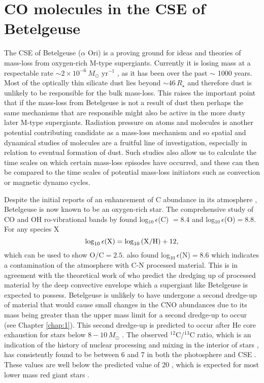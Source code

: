 \section{CO molecules in the CSE of Betelgeuse}
\label{sec:5.1}
The CSE of Betelgeuse ($\alpha$ Ori) is a proving ground for ideas and theories of mass-loss from oxygen-rich M-type supergiants. Currently it is losing mass at a respectable rate $\sim 2\times 10^{-6} \ M_{\odot}$ yr${}^{-1}$ \citep{harper_2001}, as it has been over the past $\sim$ 1000 years. Most of the optically thin silicate dust lies beyond $\sim 46\,R_{\star}$ \citep{danchi_1994} and therefore dust is unlikely to be responsible for the bulk mass-loss. This raises the important point that if the mass-loss from Betelgeuse is not a result of dust then perhaps the same mechanisms that are responsible might also be active in the more dusty later M-type supergiants. Radiation pressure on atoms and molecules is another potential contributing candidate as a mass-loss mechanism and so spatial and dynamical studies of molecules are a fruitful line of investigation, especially in relation to eventual formation of dust. Such studies also allow us to calculate the time scales on which certain mass-loss episodes have occurred, and these can then be compared to the time scales of potential mass-loss initiators such as convection or magnetic dynamo cycles.

Despite the initial reports of an enhancement of C abundance in its atmosphere \citep{spinrad_1966}, Betelgeuse is now known to be an oxygen-rich star. The comprehensive study of CO and OH ro-vibrational bands by \cite{lambert_1984} found log$_{10}$\,$\epsilon$(C) $ = 8.4$ and log$_{10}$\,$\epsilon$(O)$ = 8.8$. For any species X
\begin{equation}
\rm{log}_{10}\,\epsilon(X)=\rm{log}_{10}\,(X/H)+12,
\end{equation}
which can be used to show O/C$ = 2.5$. \cite{lambert_1984} also found log$_{10}$\,$\epsilon$(N)$ = 8.6$ which indicates a contamination of the atmosphere with C-N processed material. This is in agreement with the theoretical work of \cite{lamb_1976} who predict the dredging up of processed material by the deep convective envelope which a supergiant like Betelgeuse is expected to possess. Betelgeuse is unlikely to have undergone a second dredge-up of material that would cause small changes in the CNO abundances due to its mass being greater than the upper mass limit for a second dredge-up to occur (see Chapter \ref{chap:1}). This second dredge-up is predicted to occur after He core exhaustion for stars below $8-10 \,M_{\odot}$ \citep{kaler_1978}. The observed $^{12}$C/$^{13}$C ratio, which is an indication of the history of nuclear processing and mixing in the interior of stars \citep{pavlenko_2003,eggleton_2007}, has consistently found to be between 6 and 7 in both the photosphere and CSE \citep{lambert_1974,hinkle_1976,bernat_1979,harris_1984}. These values are well below the predicted value of 20 \citep{charbonnel_1995,pavlenko_2003}, which is expected for most lower mass red giant stars \citep[e.g.,][]{boothroyd_1999}.

